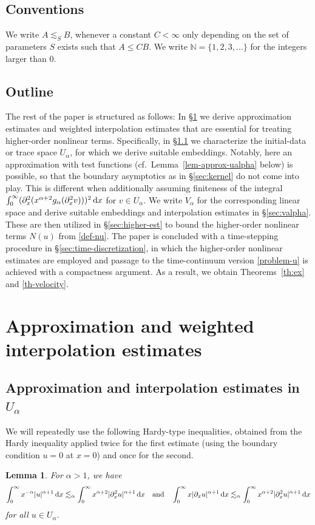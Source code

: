 \documentclass[reqno,12pt]{amsart}
\renewcommand{\d}{\ensuremath{\mathrm{d}}}
\newcommand{\N}{\ensuremath{\mathbb{N}}}
\renewcommand{\d}{\ensuremath{{\rm d}}}
\newtheorem{lemma}[theorem]{Lemma}
\numberwithin{equation}{section}
\begin{document}
%
\subsection{Conventions}
%
We write $A \lesssim_S B$, whenever a constant $C < \infty$ only depending on the set of parameters $S$ exists such that $A \le C B$. We write $\N = \{1,2,3,\ldots\}$ for the integers larger than $0$.

%
\subsection{Outline}
%
The rest of the paper is structured as follows: In \S\ref{sec:approx-embed} we derive approximation estimates and weighted interpolation estimates that are essential for treating higher-order nonlinear terms. Specifically, in \S\ref{sec:ualpha} we characterize the initial-data or trace space $U_\alpha$, for which we derive suitable embeddings. Notably, here an approximation with test functions (cf.~Lemma~\ref{lem-approx-ualpha} below) is possible, so that the boundary asymptotics as in \S\ref{sec:kernel} do not come into play. This is different when additionally assuming finiteness of the integral $\int_0^\infty (\partial_x^2 (x^{\alpha+2} g_\alpha(\partial_x^2 v)))^2 \, \d x$ for $v \in U_\alpha$. We write $V_\alpha$ for the corresponding linear space and derive suitable embeddings and interpolation estimates in \S\ref{sec:valpha}. These are then utilized in \S\ref{sec:higher-est} to bound the higher-order nonlinear terms $N(u)$ from \eqref{def-nu}. The paper is concluded with a time-stepping procedure in \S\ref{sec:time-discretization}, in which the higher-order nonlinear estimates are employed and passage to the time-continuum version \eqref{problem-u} is achieved with a compactness argument. As a result, we obtain Theorems~\ref{th:ex} and \ref{th-velocity}.

\section{Approximation and weighted interpolation estimates}\label{sec:approx-embed}
%
\subsection{Approximation and interpolation estimates in $U_\alpha$}\label{sec:ualpha}
%
We will repeatedly use the following Hardy-type inequalities, obtained from the Hardy inequality applied twice for the first estimate (using the boundary condition $u = 0$ at $x = 0$) and once for the second.
%
\begin{lemma}\label{lem:Hardy}
%
For $\alpha > 1$, we have 
%
\begin{equation}\label{eq:Hardy}
%
\int_0^\infty x^{-\alpha} |u|^{\alpha+1} \, \d x \lesssim_\alpha \int_0^\infty x^{\alpha+2} |\partial_x^2 u|^{\alpha+1} \, \d x \quad \text{and} \quad \int_0^\infty x |\partial_x u|^{\alpha+1} \, \d x \lesssim_\alpha \int_0^\infty x^{\alpha+2} |\partial_x^2 u|^{\alpha+1} \, \d x
%
\end{equation}
%
for all $u \in U_\alpha$.
\end{lemma}
%
\end{document}
